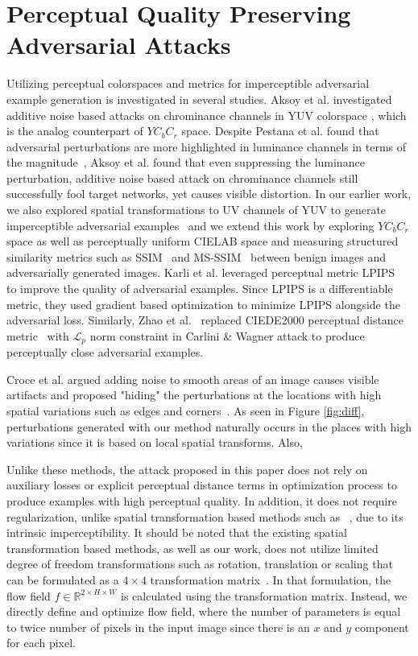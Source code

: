 \section{Perceptual Quality Preserving Adversarial Attacks}

Utilizing perceptual colorspaces and metrics for imperceptible adversarial example generation is investigated in several studies. Aksoy et al. investigated additive noise based attacks on chrominance channels in YUV colorspace \cite{aksoy2019attack}, which is the analog counterpart of \(YC_{b}C_{r}\) space. Despite Pestana et al. found that adversarial perturbations are more highlighted in luminance channels in terms of the magnitude~\cite{Pestana2020-hm}, Aksoy et al. found that even suppressing the luminance perturbation, additive noise based attack on chrominance channels still successfully fool target networks, yet causes visible distortion. In our earlier work, we also explored spatial transformations to UV channels of YUV to generate imperceptible adversarial examples~\cite{aydin2019imperceptible} and we extend this work by exploring \(YC_{b}C_{r}\) space as well as perceptually uniform CIELAB space and measuring structured similarity metrics such as SSIM~\cite{wang2004image} and MS-SSIM~\cite{wang2003multiscale} between benign images and adversarially generated images. Karli et al. leveraged perceptual metric LPIPS~\cite{zhang2018unreasonable} to improve the quality of adversarial examples. Since LPIPS is a differentiable metric, they used gradient based optimization to minimize LPIPS alongside the adversarial loss. Similarly, Zhao et al.~\cite{zhao2020large} replaced CIEDE2000 perceptual distance metric~\cite{luo2001development} with \(\mathcal{L}_{p}\) norm constraint in Carlini \& Wagner attack to produce perceptually close adversarial examples.

Croce et al. argued adding noise to smooth areas of an image causes visible artifacts and proposed "hiding" the perturbations at the locations with high spatial variations such as edges and corners~\cite{croce2019sparse}. As seen in Figure \ref{fig:diff}, perturbations generated with our method naturally occurs in the places with high variations since it is based on local spatial transforms. Also,

Unlike these methods, the attack proposed in this paper does not rely on auxiliary losses or explicit perceptual distance terms in optimization process to produce examples with high perceptual quality. In addition, it does not require regularization, unlike spatial transformation based methods such as ~\cite{xiao2018spatially}, due to its intrinsic imperceptibility. It should be noted that the existing spatial transformation based methods, as well as our work, does not utilize limited degree of freedom transformations such as rotation, translation or scaling that can be formulated as a \(4\times4\) transformation matrix~\cite{jaderberg2015spatial}. In that formulation, the flow field \(f \in \mathbb{R}^{2\times H \times W}\) is calculated using the transformation matrix. Instead, we directly define and optimize flow field, where the number of parameters is equal to twice number of pixels in the input image since there is an $x$ and $y$ component for each pixel.

